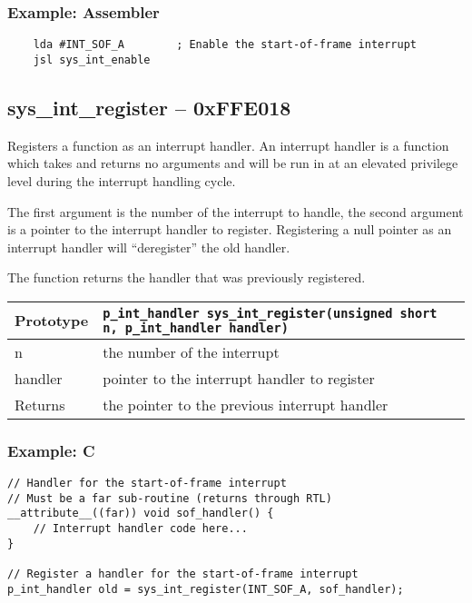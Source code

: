 \subsubsection*{Example: Assembler}
\begin{verbatim}
    lda #INT_SOF_A        ; Enable the start-of-frame interrupt
    jsl sys_int_enable
\end{verbatim}

\subsection*{sys\_int\_register -- 0xFFE018}
Registers a function as an interrupt handler. An interrupt handler is a function which takes and returns no arguments and will be
run in at an elevated privilege level during the interrupt handling cycle.

The first argument is the number of the interrupt to handle, the second argument is a pointer to the interrupt handler to register.
Registering a null pointer as an interrupt handler will ``deregister'' the old handler.

The function returns the handler that was previously registered.

\begin{tabular}{|l||l|} \hline
Prototype & \lstinline!p_int_handler sys_int_register(unsigned short n, p_int_handler handler)! \\ \hline
n & the number of the interrupt \\ \hline
handler & pointer to the interrupt handler to register \\ \hline
Returns & the pointer to the previous interrupt handler \\ \hline
\end{tabular}

\subsubsection*{Example: C}
\begin{lstlisting}
// Handler for the start-of-frame interrupt
// Must be a far sub-routine (returns through RTL)
__attribute__((far)) void sof_handler() {
	// Interrupt handler code here...
}

// Register a handler for the start-of-frame interrupt
p_int_handler old = sys_int_register(INT_SOF_A, sof_handler);
\end{lstlisting}

